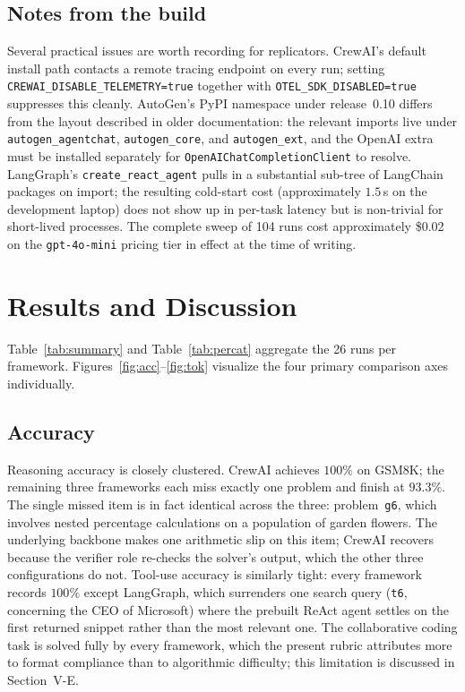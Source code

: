 \documentclass[conference]{IEEEtran}
\begin{document}
\subsection{Notes from the build}
Several practical issues are worth recording for replicators.
CrewAI's default install path contacts a remote tracing endpoint on
every run; setting \texttt{CREWAI\_DISABLE\_TELEMETRY=true} together
with \texttt{OTEL\_SDK\_DISABLED=true} suppresses this cleanly.
AutoGen's PyPI namespace under release~0.10 differs from the layout
described in older documentation: the relevant imports live under
\texttt{autogen\_agentchat}, \texttt{autogen\_core}, and
\texttt{autogen\_ext}, and the OpenAI extra must be installed
separately for \texttt{OpenAIChatCompletionClient} to resolve.
LangGraph's \texttt{create\_react\_agent} pulls in a substantial
sub-tree of LangChain packages on import; the resulting cold-start
cost (approximately $1.5\,$s on the development laptop) does not show
up in per-task latency but is non-trivial for short-lived processes.
The complete sweep of 104 runs cost approximately \$0.02 on the
\texttt{gpt-4o-mini} pricing tier in effect at the time of writing.

\section{Results and Discussion}

Table~\ref{tab:summary} and Table~\ref{tab:percat} aggregate the 26
runs per framework. Figures~\ref{fig:acc}--\ref{fig:tok} visualize the
four primary comparison axes individually.



\subsection{Accuracy}
Reasoning accuracy is closely clustered. CrewAI achieves $100\%$ on
GSM8K; the remaining three frameworks each miss exactly one problem
and finish at $93.3\%$. The single missed item is in fact identical
across the three: problem~\texttt{g6}, which involves nested
percentage calculations on a population of garden flowers. The
underlying backbone makes one arithmetic slip on this item; CrewAI
recovers because the verifier role re-checks the solver's output,
which the other three configurations do not. Tool-use accuracy is
similarly tight: every framework records $100\%$ except LangGraph,
which surrenders one search query (\texttt{t6}, concerning the CEO
of Microsoft) where the prebuilt ReAct agent settles on the first
returned snippet rather than the most relevant one. The collaborative
coding task is solved fully by every framework, which the
present rubric attributes more to format compliance than to
algorithmic difficulty; this limitation is discussed in
Section~V-E.
\end{document}
